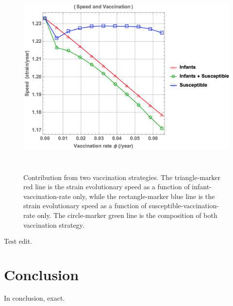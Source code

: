 \documentclass[preprint,12pt]{elsarticle}
\begin{document}
\begin{figure}
  \centering
  \includegraphics[width=6in,height=4in]{figures/NewbornS}
  \caption{Contribution from two vaccination strategies.
  The triangle-marker red line is the strain evolutionary speed as a function of infant-vaccination-rate only, while the rectangle-marker blue line is the strain evolutionary speed as a function of susceptible-vaccination-rate only.
  The circle-marker green line is the composition of both vaccination strategy.}
  \label{fig:NewbornS}
\end{figure}

Test edit.


\section{Conclusion}
In conclusion, exact.





\end{document}
